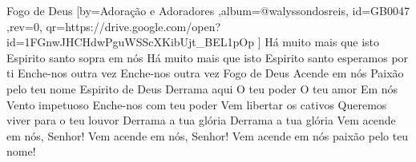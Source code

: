 \beginsong
{Fogo de Deus %
}[by={Adoração e Adoradores %
},album={@walyssondosreis},
id={GB0047 %
},rev={0}, %
qr={https://drive.google.com/open?id=1FGnwJHCHdwPguWSScXKibUjt_BEL1pOp %
}]
\beginverse*
Há muito mais que isto
Espirito santo sopra em nós
Há muito mais que isto
Espirito santo esperamos por ti
\endverse
\beginverse*
Enche-nos outra vez
Enche-nos outra vez
\endverse
\beginchorus
Fogo de Deus
Acende em nós
Paixão pelo teu nome
Espirito de Deus
Derrama aqui
O teu poder
O teu amor
Em nós
\endchorus
\beginverse*
Vento impetuoso
Enche-nos com teu poder
Vem libertar os cativos
Queremos viver para o teu louvor
Derrama a tua glória
Derrama a tua glória
\endverse
\beginverse*
Vem acende em nós, Senhor!
Vem acende em nós, Senhor!
Vem acende em nós paixão pelo teu nome!
\endverse

